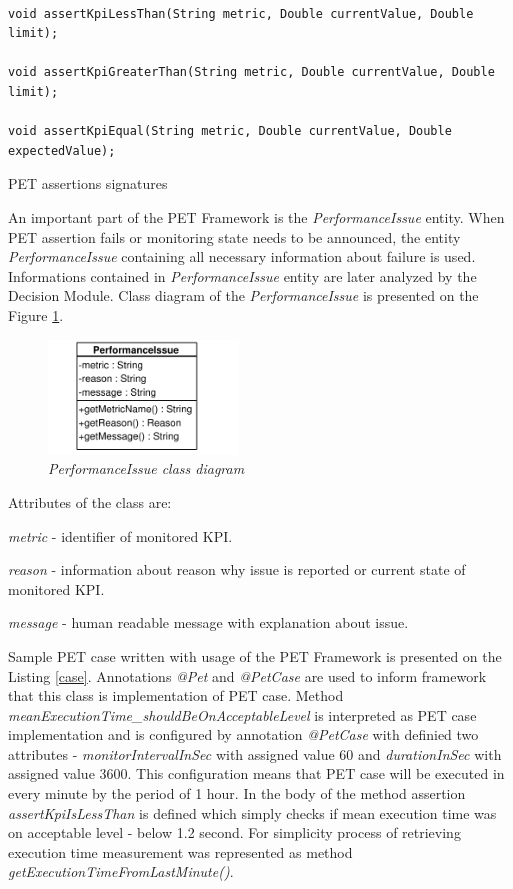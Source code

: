 \documentclass[12pt,a4paper]{article}
\let\tempone\itemize
\let\temptwo\enditemize
\renewenvironment{itemize}{\tempone\addtolength{\itemsep}{-0.4\baselineskip}}{\temptwo}
\begin{document}
\begin{listing}[ht]\begin{verbatim}

void assertKpiLessThan(String metric, Double currentValue, Double limit);

void assertKpiGreaterThan(String metric, Double currentValue, Double limit);

void assertKpiEqual(String metric, Double currentValue, Double expectedValue);
\end{verbatim}
\caption{PET assertions signatures} \label{assertions}
\end{listing}

An important part of the PET Framework is the \textit{PerformanceIssue} entity. When PET assertion fails or monitoring state needs to be announced, the entity \textit{PerformanceIssue} containing all necessary information about failure is used. Informations contained in \textit{PerformanceIssue} entity are later analyzed by the Decision Module. Class diagram of the \textit{PerformanceIssue} is presented on the Figure \ref{issue}.

\begin{figure}[!htb]
\centering
\includegraphics[width=0.45\textwidth]{PerformanceIssueClassDiagram}
\caption{\textit{PerformanceIssue class diagram}} \label{issue}
\end{figure}
 
Attributes of the class are: 
\begin{itemize}
\item \textit{metric} - identifier of monitored KPI.
\item \textit{reason} - information about reason why issue is reported or current state of monitored KPI.
\item \textit{message} - human readable message with explanation about issue.
\end{itemize}

Sample PET case written with usage of the PET Framework is presented on the Listing \ref{case}. Annotations \textit{@Pet} and \textit{@PetCase} are used to inform framework that this class is implementation of PET case. Method  \textit{meanExecutionTime\_shouldBeOnAcceptableLevel} is interpreted as PET case implementation and is configured by annotation \textit{@PetCase} with definied two attributes - \textit{monitorIntervalInSec} with assigned value 60 and \textit{durationInSec} with assigned value 3600. This configuration means that PET case will be executed in every minute by the period of 1 hour. In the body of the method assertion \textit{assertKpiIsLessThan} is defined which simply checks if mean execution time was on acceptable level - below 1.2 second. For simplicity process of retrieving execution time measurement was represented as method  \textit{getExecutionTimeFromLastMinute()}.  
\end{document}
